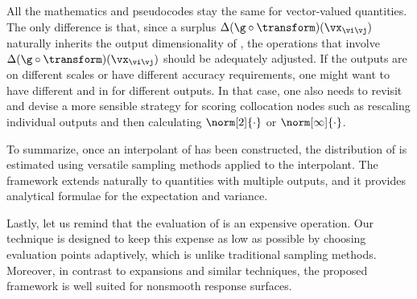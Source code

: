 \begin{remark} 
All the mathematics and pseudocodes stay the same for vector-valued quantities.
The only difference is that, since a surplus $\Delta(\g \circ
\transform)(\vx_{\vi \vj})$ naturally inherits the output dimensionality of \g,
the operations that involve $\Delta(\g \circ \transform)(\vx_{\vi \vj})$ should
be adequately adjusted. If the outputs are on different scales or have different
accuracy requirements, one might want to have different  and 
in  for different outputs. In that case, one also needs
to revisit  and devise a more sensible strategy for
scoring collocation nodes such as rescaling individual outputs and then
calculating $\norm[2]{\cdot}$ or $\norm[\infty]{\cdot}$.
\end{remark}

To summarize, once an interpolant of \g has been constructed, the distribution
of \g is estimated using versatile sampling methods applied to the interpolant.
The framework extends naturally to quantities with multiple outputs, and it
provides analytical formulae for the expectation and variance.

Lastly, let us remind that the evaluation of \g is an expensive operation. Our
technique is designed to keep this expense as low as possible by choosing
evaluation points adaptively, which is unlike traditional sampling methods.
Moreover, in contrast to  expansions and similar techniques, the proposed
framework is well suited for nonsmooth response surfaces.
